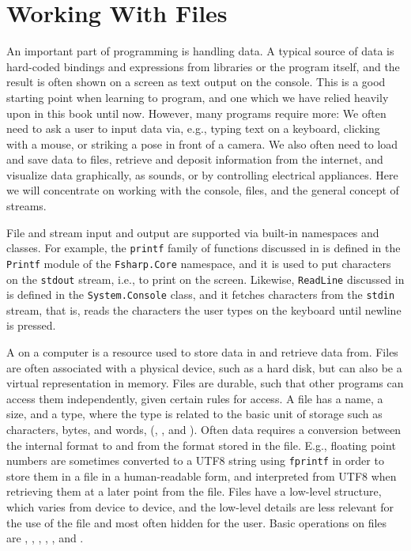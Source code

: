 \documentclass[fsharpNotes.tex]{subfiles}
\begin{document}
\chapter{Working With Files}
\label{chap:IO}
An important part of programming is handling data. A typical source of data is hard-coded bindings and expressions from libraries or the program itself, and the result is often shown on a screen as text output on the console. This is a good starting point when learning to program, and one which we have relied heavily upon in this book until now. However, many programs require more: We often need to ask a user to input data via, e.g., typing text on a keyboard, clicking with a mouse, or striking a pose in front of a camera. We also often need to load and save data to files, retrieve and deposit information from the internet, and visualize data graphically, as sounds, or by controlling electrical appliances. Here we will concentrate on working with the console, files, and the general concept of streams.

File and stream input and output are supported via built-in namespaces and classes. For example, the \lstinline!printf! family of functions discussed in  is defined in the \lstinline!Printf! module of the \lstinline!Fsharp.Core! namespace, and it is used to put characters on the \lstinline{stdout} stream, i.e., to print on the screen. Likewise, \lstinline{ReadLine} discussed in  is defined in the \lstinline{System.Console} class, and it fetches characters from the \lstinline{stdin} stream, that is, reads the characters the user types on the keyboard until newline is pressed.

A  on a computer is a resource used to store data in and retrieve data from. Files are often associated with a physical device, such as a hard disk, but can also be a virtual representation in memory. Files are durable, such that other programs can access them independently, given certain rules for access. A file has a name, a size, and a type, where the type is related to the basic unit of storage such as characters, bytes, and words, (, , and ). Often data requires a conversion between the internal format to and from the format stored in the file. E.g., floating point numbers are sometimes converted to a UTF8 string using \lstinline!fprintf! in order to store them in a file in a human-readable form, and interpreted from UTF8 when retrieving them at a later point from the file. Files have a low-level structure, which varies from device to device, and the low-level details are less relevant for the use of the file and most often hidden for the user. Basic operations on files are , , , , , and .
\end{document}
